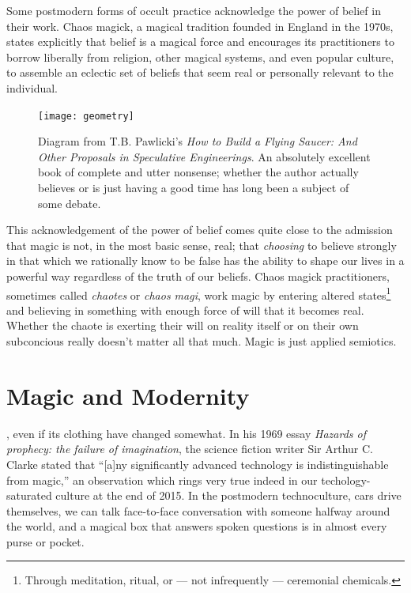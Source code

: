 \documentclass[a4paper,nobib]{tufte-handout}
\begin{document}
Some postmodern forms of occult practice acknowledge the power of belief in their work. Chaos magick, a magical tradition founded in England in the 1970s, states explicitly that belief is a magical force and encourages its practitioners to borrow liberally from religion, other magical systems, and even popular culture, to assemble an eclectic set of beliefs that seem real or personally relevant to the individual.\autocite{carroll1987liber,carroll1992liber,sherwin1992book}


\begin{figure}
    \texttt{[image: geometry]}
    \caption{Diagram from T.B. Pawlicki's \emph{How to Build a Flying Saucer: And Other Proposals in Speculative Engineerings}. An absolutely excellent book of complete and utter nonsense; whether the author actually believes or is just having a good time has long been a subject of some debate.}
    \label{fig:geom}
\end{figure}

This acknowledgement of the power of belief comes quite close to the admission that magic is not, in the most basic sense, real; that \emph{choosing} to believe strongly in that which we rationally know to be false has the ability to shape our lives in a powerful way regardless of the truth of our beliefs. Chaos magick practitioners, sometimes called \emph{chaotes} or \emph{chaos magi}, work magic by entering altered states\footnote{Through meditation, ritual, or --- not infrequently --- ceremonial chemicals.} and believing in something with enough force of will that it becomes real.\autocite{carroll1987liber,carroll1992liber,sherwin1992book}  Whether the chaote is exerting their will on reality itself or on their own subconcious really doesn't matter all that much. Magic is just applied semiotics.

\section{Magic and Modernity}

, even if its clothing have changed somewhat. In his 1969 essay \emph{Hazards of prophecy: the failure of imagination}, the science fiction writer Sir Arthur C. Clarke stated that ``[a]ny significantly advanced technology is indistinguishable from magic,''\autocite{clarke1962hazards} an observation which rings very true indeed in our techology-saturated culture at the end of 2015. In the postmodern technoculture, cars drive themselves, we can talk face-to-face conversation with someone halfway around the world, and a magical box that answers spoken questions is in almost every purse or pocket.
\end{document}
